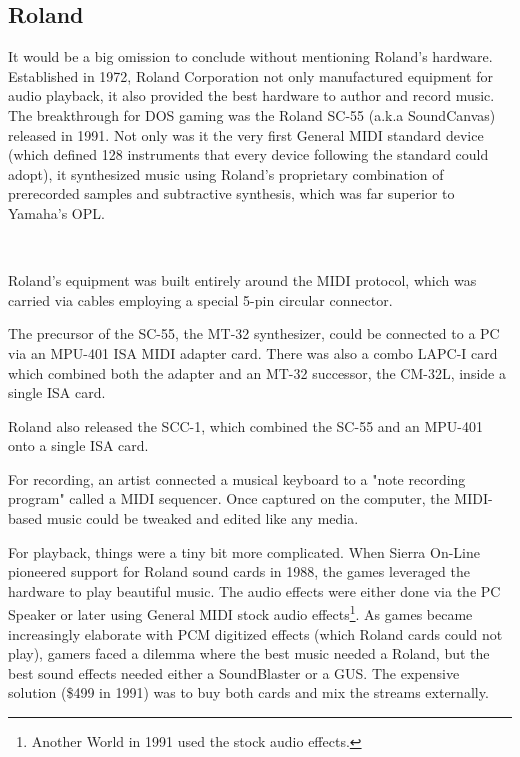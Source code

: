  \subsection{Roland}
It would be a big omission to conclude without mentioning Roland's hardware. Established in 1972, Roland Corporation not only manufactured equipment for audio playback, it also provided the best hardware to author and record music. The breakthrough for DOS gaming was the Roland SC-55 (a.k.a SoundCanvas) released in 1991. Not only was it the very first General MIDI standard device (which defined 128 instruments that every device following the standard could adopt), it synthesized music using Roland's proprietary combination of prerecorded samples and subtractive synthesis, which was far superior to Yamaha's OPL.\\
 \par
 \\
 \par

Roland's equipment was built entirely around the MIDI protocol, which was carried via cables employing a special 5-pin circular connector.\\
\par
 The precursor of the SC-55, the MT-32 synthesizer, could be connected to a PC via an MPU-401 ISA MIDI adapter card. There was also a combo LAPC-I card which combined both the adapter and an MT-32 successor, the CM-32L, inside a single ISA card.\\
\par 
{}
\par
Roland also released the SCC-1, which combined the SC-55 and an MPU-401 onto a single ISA card.\\
\par 
{}
\par
\pagebreak
For recording, an artist connected a musical keyboard to a "note recording program" called a MIDI sequencer. Once captured on the computer, the MIDI-based music could be tweaked and edited like any media.\\

\par
For playback, things were a tiny bit more complicated. When Sierra On-Line pioneered support for Roland sound cards in 1988, the games leveraged the hardware to play beautiful music. The audio effects were either done via the PC Speaker or later using General MIDI stock audio effects\footnote{Another World in 1991 used the stock audio effects.}. As games became increasingly elaborate with PCM digitized effects (which Roland cards could not play), gamers faced a dilemma where the best music needed a Roland, but the best sound effects needed either a SoundBlaster or a GUS. The expensive solution (\$499 in 1991) was to buy both cards and mix the streams externally.\\
\par
{}

